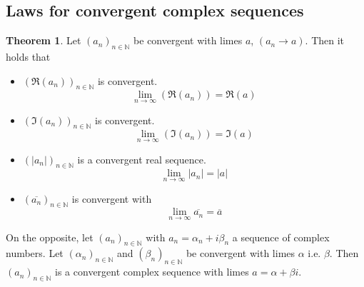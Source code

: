 \documentclass[a4paper,landscape,twocolumn]{article}
\theoremstyle{definition}
\newtheorem{theorem}{Theorem}
\newcommand\abs[1]{\left|#1\right|}
\newcommand\seq[1]{{\left(#1\right)}_{n \in \mathbb N}}
\begin{document}
\subsection{Laws for convergent complex sequences}
%
\begin{theorem}
  Let $(a_n)_{n \in \mathbb N}$ be convergent with limes $a$, $(a_n \rightarrow a)$. Then it holds that
  \begin{itemize}
    \item $\left(\Re(a_n)\right)_{n \in \mathbb N}$ is convergent.
      \[ \lim_{n \to \infty} \left(\Re(a_n)\right) = \Re(a) \]
    \item $\left(\Im(a_n)\right)_{n \in \mathbb N}$ is convergent.
      \[ \lim_{n \to \infty} \left(\Im(a_n)\right) = \Im(a) \]
    \item $\left(\abs{a_n}\right)_{n \in \mathbb N}$ is a convergent real sequence.
      \[ \lim_{n \to \infty} \abs{a_n} = \abs{a} \]
    \item $\left(\overline{a_n}\right)_{n \in \mathbb N}$ is convergent with
      \[ \lim_{n \to \infty} \overline{a_n} = \overline{a} \]
  \end{itemize}

  On the opposite, let $\seq{a_n}$ with $a_n = \alpha_n + i \beta_n$ a sequence of complex numbers.
  Let $\seq{\alpha_n}$ and $\seq{\beta_n}$ be convergent with limes $\alpha$ i.e. $\beta$.
  Then $\seq{a_n}$ is a convergent complex sequence with limes $a = \alpha+\beta i$.
\end{theorem}
\end{document}
